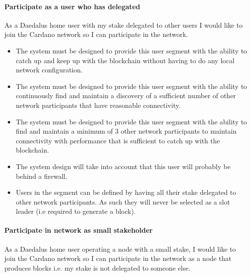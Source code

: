 \documentclass{report}
\theoremstyle{definition}{
  \newtheorem{lemma}{Lemma}[section] %
  \newtheorem{definition}[lemma]{Definition}
}
\theoremstyle{theorem}{
  \newtheorem{invariant}[lemma]{Invariant}
  \newtheorem{proofobligation}[lemma]{Proof Obligation}
}
\numberwithin{equation}{lemma}
\begin{document}
\paragraph{Participate as a user who has delegated}

As a Daedalus home user with my stake delegated to other users
I would like to join the Cardano network so I can participate in the network.
\begin{itemize}
\item The system must be designed to provide this user segment with the ability
      to catch up and keep up with the blockchain without having
      to do any local network configuration.
\item The system must be designed to provide this user segment with the ability to
      continuously find and maintain a discovery of a sufficient number of
      other network participants that have reasonable connectivity.
\item The system must be designed to provide this user segment with the ability to
      find and maintain a minimum of 3 other network participants to maintain
      connectivity with performance that is sufficient to catch up with the
      blockchain.
\item The system design will take into account that this user will probably be
      behind a firewall.
\item Users in the segment can be defined by having all their stake
      delegated to other network participants.
      As such they will never be selected as a slot leader (i.e required to generate a block).
\end{itemize}


\paragraph{Participate in network as small stakeholder}

As a Daedalus home user operating a node with a small stake,
I would like to join the Cardano network so I can participate in the network as a
node that produces blocks i.e. my stake is not delegated to someone else.
\end{document}
